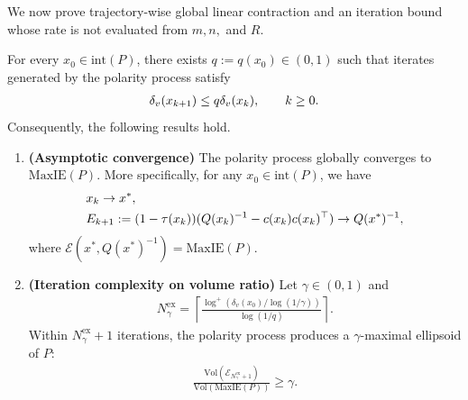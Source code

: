 \documentclass[smallextended]{svjour3}
\newcommand{\E}{\mathcal{E}}
\newcommand{\MaxIE}{\mathrm{MaxIE}}
\newcommand{\Vol}{\mathrm{Vol}}
\begin{document}
We now prove trajectory-wise global linear contraction and an iteration bound
whose rate is not evaluated from $m,n,$ and $R$.
\begin{theorem}\label{thm: polarity_process_convergence_rate}
    For every $x_0\in \mathrm{int}(P)$, there exists $q := q(x_0)\in (0,1)$ such that iterates generated by the polarity process satisfy
    \begin{align}
        \delta_v(x_{k+1}) \leq q \delta_v(x_k), \qquad k\geq0. \notag
    \end{align}
    Consequently, the following results hold.
    \begin{enumerate}
        \item\textbf{(Asymptotic convergence)} The polarity process globally converges to $\MaxIE(P)$. More specifically, for any $x_0 \in \mathrm{int}(P)$, we have
        \begin{align}
            & x_k \rightarrow x^*, \notag \\
            & E_{k+1} := (1-\tau(x_k))(Q(x_k)^{-1} - c(x_k)c(x_k)^\top)\rightarrow Q(x^*)^{-1}, \notag
        \end{align}
        where $\E(x^*, Q(x^*)^{-1})=\MaxIE(P)$.
        \item \textbf{(Iteration complexity on volume ratio)} Let $\gamma \in (0, 1)$ and
        \begin{align*}
            N_\gamma^{\mathrm{ex}}
            = \left\lceil
            \frac{\log^+ (\delta_v(x_0)/\log(1/\gamma))}{\log(1/q)}
            \right\rceil.
        \end{align*}
        Within $N_\gamma^{\mathrm{ex}}+1$ iterations, the polarity process
        produces a $\gamma$-maximal ellipsoid of $P$:
        \begin{align}
            \frac{\Vol( \E_{N_\gamma^{\mathrm{ex}}+1})}
            {\Vol(\MaxIE(P))} \geq \gamma.
        \end{align}
    \end{enumerate}
\end{theorem}
\end{document}

